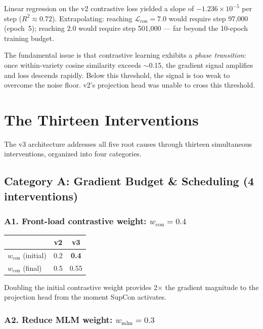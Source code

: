 \documentclass[11pt,a4paper]{article}
\newcommand{\loss}{\mathcal{L}}
\begin{document}
Linear regression on the v2 contrastive loss yielded a slope of
$-1.236 \times 10^{-5}$ per step ($R^2 \approx 0.72$). Extrapolating:
reaching $\loss_{\text{con}} = 7.0$ would require step 97{,}000 (epoch~5);
reaching $2.0$ would require step 501{,}000 --- far beyond the 10-epoch
training budget.

The fundamental issue is that contrastive learning exhibits a
\emph{phase transition}: once within-variety cosine similarity exceeds
$\sim$0.15, the gradient signal amplifies and loss descends rapidly. Below
this threshold, the signal is too weak to overcome the noise floor.
v2's projection head was unable to cross this threshold.

\section{The Thirteen Interventions}

The v3 architecture addresses all five root causes through thirteen
simultaneous interventions, organized into four categories.

\subsection{Category A: Gradient Budget \& Scheduling (4 interventions)}

\subsubsection{A1. Front-load contrastive weight: $w_{\text{con}} = 0.4$}

\begin{tabular}{lcc}
\toprule
& \textbf{v2} & \textbf{v3} \\
\midrule
$w_{\text{con}}$ (initial) & 0.2 & \textbf{0.4} \\
$w_{\text{con}}$ (final) & 0.5 & 0.55 \\
\bottomrule
\end{tabular}

\medskip
Doubling the initial contrastive weight provides 2$\times$ the gradient
magnitude to the projection head from the moment SupCon activates.

\subsubsection{A2. Reduce MLM weight: $w_{\text{mlm}} = 0.3$}
\end{document}
